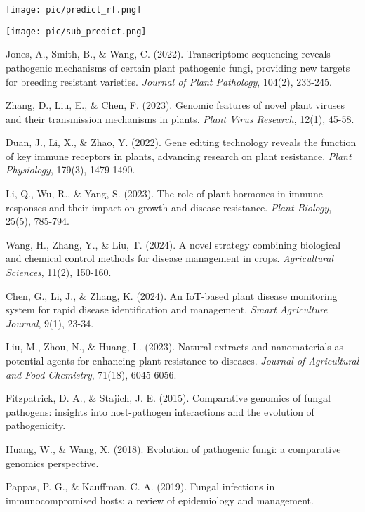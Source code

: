 \documentclass{article}
\begin{document}
\par
\texttt{[image: pic/predict\_rf.png]} %
\par
\texttt{[image: pic/sub\_predict.png]} %
\begin{thebibliography}{99}
Jones, A., Smith, B., \& Wang, C. (2022). Transcriptome sequencing reveals pathogenic mechanisms of certain plant pathogenic fungi, providing new targets for breeding resistant varieties. \textit{Journal of Plant Pathology}, 104(2), 233-245.

Zhang, D., Liu, E., \& Chen, F. (2023). Genomic features of novel plant viruses and their transmission mechanisms in plants. \textit{Plant Virus Research}, 12(1), 45-58.

Duan, J., Li, X., \& Zhao, Y. (2022). Gene editing technology reveals the function of key immune receptors in plants, advancing research on plant resistance. \textit{Plant Physiology}, 179(3), 1479-1490.

Li, Q., Wu, R., \& Yang, S. (2023). The role of plant hormones in immune responses and their impact on growth and disease resistance. \textit{Plant Biology}, 25(5), 785-794.

Wang, H., Zhang, Y., \& Liu, T. (2024). A novel strategy combining biological and chemical control methods for disease management in crops. \textit{Agricultural Sciences}, 11(2), 150-160.

Chen, G., Li, J., \& Zhang, K. (2024). An IoT-based plant disease monitoring system for rapid disease identification and management. \textit{Smart Agriculture Journal}, 9(1), 23-34.

Liu, M., Zhou, N., \& Huang, L. (2023). Natural extracts and nanomaterials as potential agents for enhancing plant resistance to diseases. \textit{Journal of Agricultural and Food Chemistry}, 71(18), 6045-6056.
	
 Fitzpatrick, D. A., \& Stajich, J. E. (2015). Comparative genomics of fungal pathogens: insights into host-pathogen interactions and the evolution of pathogenicity.

 Huang, W., \& Wang, X. (2018). Evolution of pathogenic fungi: a comparative genomics perspective.

 Pappas, P. G., \& Kauffman, C. A. (2019). Fungal infections in immunocompromised hosts: a review of epidemiology and management.


\end{thebibliography}
\end{document}

